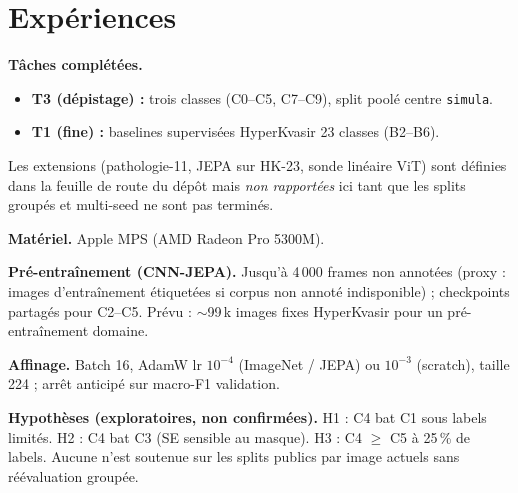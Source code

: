 \section{Expériences}
\label{sec:experiments}

\textbf{Tâches complétées.}
\begin{itemize}
  \item \textbf{T3 (dépistage) :} trois classes (C0--C5, C7--C9), split poolé centre \texttt{simula}.
  \item \textbf{T1 (fine) :} baselines supervisées HyperKvasir 23 classes (B2--B6).
\end{itemize}
Les extensions (pathologie-11, JEPA sur HK-23, sonde linéaire ViT) sont définies dans la feuille de route du dépôt mais \emph{non rapportées} ici tant que les splits groupés et multi-seed ne sont pas terminés.

\textbf{Matériel.} Apple MPS (AMD Radeon Pro 5300M).

\textbf{Pré-entraînement (CNN-JEPA).} Jusqu'à 4\,000 frames non annotées (proxy : images d'entraînement étiquetées si corpus non annoté indisponible) ; checkpoints partagés pour C2--C5.
Prévu : $\sim$99\,k images fixes HyperKvasir pour un pré-entraînement domaine.

\textbf{Affinage.} Batch 16, AdamW lr $10^{-4}$ (ImageNet / JEPA) ou $10^{-3}$ (scratch), taille 224 ; arrêt anticipé sur macro-F1 validation.

\textbf{Hypothèses (exploratoires, non confirmées).}
H1 : C4 bat C1 sous labels limités.
H2 : C4 bat C3 (SE sensible au masque).
H3 : C4 $\geq$ C5 à 25\,\% de labels.
Aucune n'est soutenue sur les splits publics par image actuels sans réévaluation groupée.
